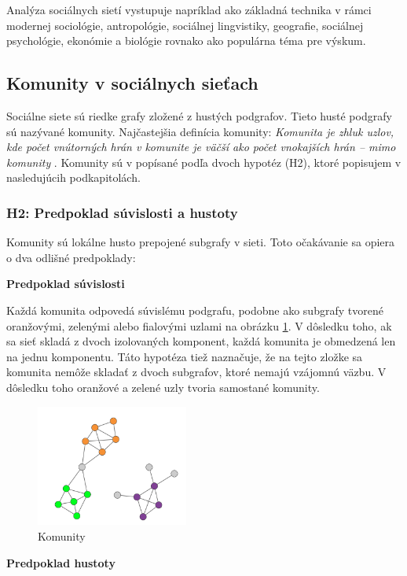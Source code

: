 \documentclass[slovak,master,public,dept460,male,cpdeclaration,oneside]{diploma}
\begin{document}
Analýza sociálnych sietí vystupuje napríklad ako základná technika v rámci modernej sociológie,
antropológie, sociálnej lingvistiky, geografie, sociálnej psychológie, ekonómie a biológie
rovnako ako populárna téma pre výskum. 

\subsection{Komunity v sociálnych sieťach}

Sociálne siete sú riedke grafy zložené z hustých podgrafov. Tieto husté podgrafy sú nazývané
komunity. Najčastejšia definícia komunity: \textit{Komunita je zhluk uzlov, kde počet vnútorných hrán v komunite je väčší ako počet vnokajších hrán – mimo komunity} \cite{8}. Komunity sú v \cite{barabasi2016network} popísané podľa dvoch hypotéz (H2), ktoré popisujem v nasledujúcih podkapitolách.


\subsubsection{H2: Predpoklad súvislosti a hustoty}
Komunity sú lokálne husto prepojené subgrafy v sieti. Toto očakávanie sa opiera o dva odlišné predpoklady:

\noindent\textbf{Predpoklad súvislosti}


Každá komunita odpovedá súvislému podgrafu, podobne ako subgrafy tvorené oranžovými, zelenými alebo fialovými uzlami na obrázku \ref{komunity}. V dôsledku toho, ak sa sieť skladá z dvoch izolovaných komponent, každá komunita je obmedzená len na jednu komponentu. Táto hypotéza tiež naznačuje, že na tejto zložke sa komunita nemôže skladať z dvoch subgrafov, ktoré nemajú vzájomnú väzbu. V dôsledku toho oranžové a zelené uzly tvoria samostané komunity. \cite{barabasi2016network}


\begin{figure}[H]
\centering
\includegraphics[width=5cm,height=4cm]{figures/komm}
\caption{Komunity}
\label{komunity}
\end{figure}

\noindent\textbf{Predpoklad hustoty}
\end{document}
